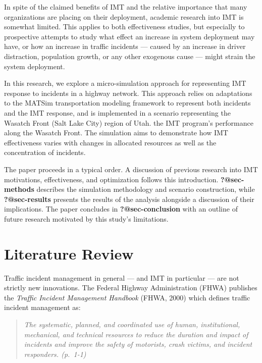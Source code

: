 \documentclass[
  letterpaper,
  DIV=11,
  numbers=noendperiod]{scrreprt}
\begin{document}
In spite of the claimed benefits of IMT and the relative importance that
many organizations are placing on their deployment, academic research
into IMT is somewhat limited. This applies to both effectiveness
studies, but especially to prospective attempts to study what effect an
increase in system deployment may have, or how an increase in traffic
incidents --- caused by an increase in driver distraction, population
growth, or any other exogenous cause --- might strain the system
deployment.

In this research, we explore a micro-simulation approach for
representing IMT response to incidents in a highway network. This
approach relies on adaptations to the MATSim transportation modeling
framework to represent both incidents and the IMT response, and is
implemented in a scenario representing the Wasatch Front (Salt Lake
City) region of Utah. the IMT program's performance along the Wasatch
Front. The simulation aims to demonstrate how IMT effectiveness varies
with changes in allocated resources as well as the concentration of
incidents.

The paper proceeds in a typical order. A discussion of previous research
into IMT motivations, effectiveness, and optimization follows this
introduction. \textbf{?@sec-methods} describes the simulation
methodology and scenario construction, while \textbf{?@sec-results}
presents the results of the analysis alongside a discussion of their
implications. The paper concludes in \textbf{?@sec-conclusion} with an
outline of future research motivated by this study's limitations.


\hypertarget{sec-literature}{%
\chapter{Literature Review}\label{sec-literature}}

Traffic incident management in general --- and IMT in particular --- are
not strictly new innovations. The Federal Highway Administration (FHWA)
publishes the \emph{Traffic Incident Management Handbook} (FHWA, 2000)
which defines traffic incident management as:

\begin{quote}
\emph{The systematic, planned, and coordinated use of human,
institutional, mechanical, and technical resources to reduce the
duration and impact of incidents and improve the safety of motorists,
crash victims, and incident responders. (p.~1-1)}
\end{quote}
\end{document}
